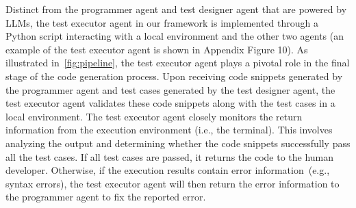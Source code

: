 \documentclass{article}
\begin{document}
Distinct from the programmer agent and test designer agent that are powered by LLMs, the test executor agent in our framework is implemented through a Python script interacting with a local environment and the other two agents (an example of the test executor agent is shown in Appendix Figure 10). As illustrated in~\cref{fig:pipeline}, the test executor agent plays a pivotal role in the final stage of the code generation process. Upon receiving code snippets generated by the programmer agent and test cases generated by the test designer agent, the test executor agent validates these code snippets along with the test cases in a local environment. 
The test executor agent closely monitors the return information from the execution environment (i.e., the terminal). This involves analyzing the output and determining whether the code snippets successfully pass all the test cases. If all test cases are passed, it returns the code to the human developer. Otherwise, if the execution results contain error information~(e.g., syntax errors), the test executor agent will then return the error information to the programmer agent to fix the reported error. 
\end{document}
